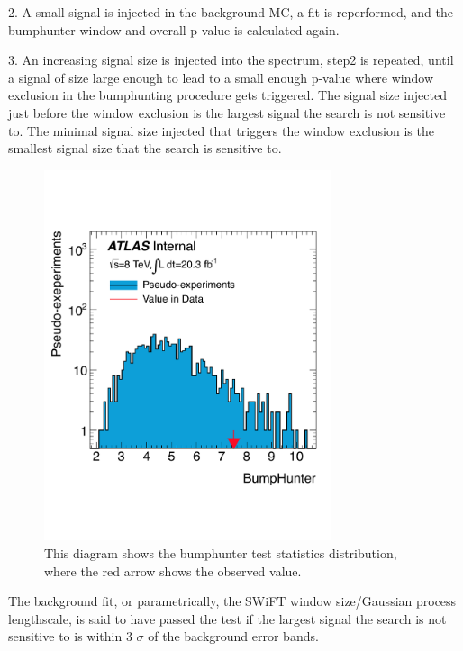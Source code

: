    2. A small signal is injected in the background MC, a fit is reperformed, and the bumphunter window and overall p-value is calculated again. 

   3. An increasing signal size is injected into the spectrum, step2 is repeated, until a signal of size large enough to lead to a small enough p-value where window exclusion in the bumphunting procedure gets triggered. The signal size injected just before the window exclusion is the largest signal the search is not sensitive to. The minimal signal size injected that triggers the window exclusion is the smallest signal size that the search is sensitive to. 

\begin{figure}[!htb]
    \begin{center}
        \includegraphics[width=0.75\textwidth]{figures/chapter_analysismethod/bumphunter}
        \caption{
            This diagram shows the bumphunter test statistics distribution, where the red arrow shows the observed value. 
        }
        \label{fig:teststats}
    \end{center}
\end{figure}
\FloatBarrier
   
   The background fit, or parametrically, the SWiFT window size/Gaussian process lengthscale, is said to have passed the test if the largest signal the search is not sensitive to is within 3 $\sigma$ of the background error bands. 

